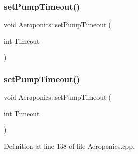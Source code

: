 \subsubsection{\texorpdfstring{set\+Pump\+Timeout()}{setPumpTimeout()}\hspace{0.1cm}{\footnotesize\ttfamily [1/2]}}
{\footnotesize\ttfamily void Aeroponics\+::set\+Pump\+Timeout (\begin{DoxyParamCaption}\item[{int}]{Timeout }\end{DoxyParamCaption})\hspace{0.3cm}{\ttfamily [protected]}}

\mbox{\label{class_aeroponics_ac0363ff5470e85f5acda1842a616dd41}} 
\subsubsection{\texorpdfstring{set\+Pump\+Timeout()}{setPumpTimeout()}\hspace{0.1cm}{\footnotesize\ttfamily [2/2]}}
{\footnotesize\ttfamily void Aeroponics\+::set\+Pump\+Timeout (\begin{DoxyParamCaption}\item[{int}]{Timeout }\end{DoxyParamCaption})\hspace{0.3cm}{\ttfamily [protected]}}



Definition at line 138 of file Aeroponics.\+cpp.

